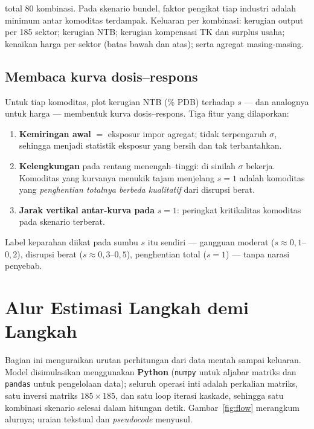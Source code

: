 \documentclass[
  manuscript=article,
  layout=publish,
  year=2026,
  volume=1,
]{den}
\providecommand{\tightlist}{%
  \setlength{\itemsep}{0pt}\setlength{\parskip}{0pt}}
\begin{document}
total 80 kombinasi. Pada skenario bundel, faktor pengikat tiap industri
adalah minimum antar komoditas terdampak. Keluaran per kombinasi:
kerugian output per 185 sektor; kerugian NTB; kerugian kompensasi TK dan
surplus usaha; kenaikan harga per sektor (batas bawah dan atas); serta
agregat masing-masing.

\subsection{Membaca kurva
dosis--respons}\label{membaca-kurva-dosisrespons}

Untuk tiap komoditas, plot kerugian NTB (\% PDB) terhadap \(s\) --- dan
analognya untuk harga --- membentuk kurva dosis--respons. Tiga fitur
yang dilaporkan:

\begin{enumerate}
\def\labelenumi{\arabic{enumi}.}
\tightlist
\item
  \textbf{Kemiringan awal} \(=\) eksposur impor agregat; tidak
  terpengaruh \(\sigma\), sehingga menjadi statistik eksposur yang
  bersih dan tak terbantahkan.
\item
  \textbf{Kelengkungan} pada rentang menengah--tinggi: di sinilah
  \(\sigma\) bekerja. Komoditas yang kurvanya menukik tajam menjelang
  \(s = 1\) adalah komoditas yang \emph{penghentian totalnya berbeda
  kualitatif} dari disrupsi berat.
\item
  \textbf{Jarak vertikal antar-kurva pada} \(s = 1\): peringkat
  kritikalitas komoditas pada skenario terberat.
\end{enumerate}

Label keparahan diikat pada sumbu \(s\) itu sendiri --- gangguan moderat
(\(s \approx
0{,}1\)--\(0{,}2\)), disrupsi berat (\(s \approx 0{,}3\)--\(0{,}5\)),
penghentian total (\(s = 1\)) --- tanpa narasi penyebab.

\section{Alur Estimasi Langkah demi Langkah}\label{sec-algo}

Bagian ini menguraikan urutan perhitungan dari data mentah sampai
keluaran. Model disimulasikan menggunakan \textbf{Python}
(\texttt{numpy} untuk aljabar matriks dan \texttt{pandas} untuk
pengelolaan data); seluruh operasi inti adalah perkalian matriks, satu
inversi matriks \(185 \times 185\), dan satu loop iterasi kaskade,
sehingga satu kombinasi skenario selesai dalam hitungan detik.
Gambar~\ref{fig:flow} merangkum alurnya; uraian tekstual dan
\emph{pseudocode} menyusul.
\end{document}
